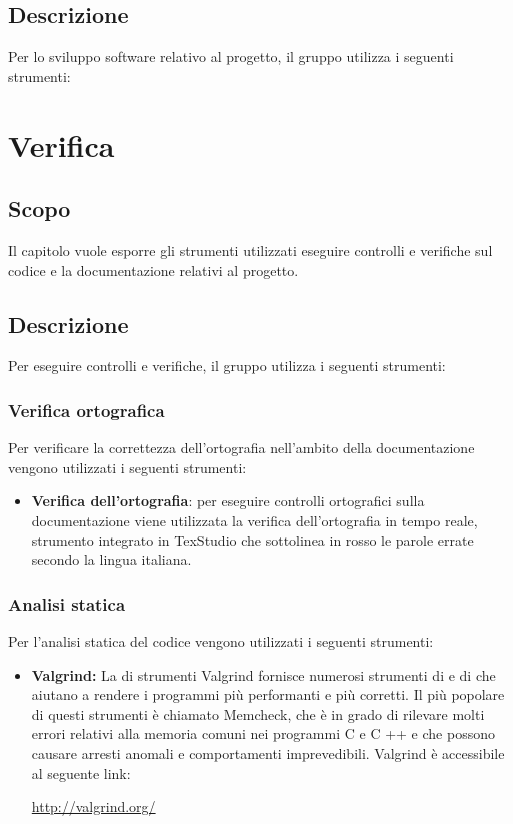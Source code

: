 \documentclass[openany,12pt,a4paper]{report}
\begin{document}
\section{Descrizione}
Per lo sviluppo software relativo al progetto, il gruppo utilizza i seguenti strumenti:


\chapter{Verifica}

\section{Scopo}

Il capitolo vuole esporre gli strumenti utilizzati eseguire controlli e verifiche sul codice e la documentazione relativi al progetto. 

\section{Descrizione}

Per eseguire controlli e verifiche, il gruppo utilizza i seguenti strumenti:

\subsection{Verifica ortografica}
Per verificare la correttezza dell'ortografia nell'ambito della documentazione vengono utilizzati i seguenti strumenti:

\begin{itemize}
    \item \textbf{Verifica dell'ortografia}: per eseguire controlli ortografici sulla documentazione viene utilizzata la verifica dell’ortografia in tempo reale, strumento integrato in TexStudio che sottolinea in rosso le parole errate secondo la lingua italiana.
\end{itemize}

\subsection{Analisi statica}
Per l’analisi statica del codice vengono utilizzati i seguenti strumenti:
    \begin{itemize}
        \item \textbf{Valgrind:} La  di strumenti Valgrind fornisce numerosi strumenti di  e di  che aiutano a rendere i programmi più performanti e più corretti. Il più popolare di questi strumenti è chiamato Memcheck, che è in grado di rilevare molti errori relativi alla memoria comuni nei programmi C e C ++ e che possono causare arresti anomali e comportamenti imprevedibili. Valgrind è accessibile al seguente link: \\ \centerline{\url{http://valgrind.org/}}
    \end{itemize}
    
\end{document}
